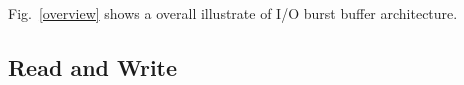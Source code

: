 Fig.~\ref{overview} shows a overall illustrate of I/O burst buffer architecture.








\subsection{Read and Write}

